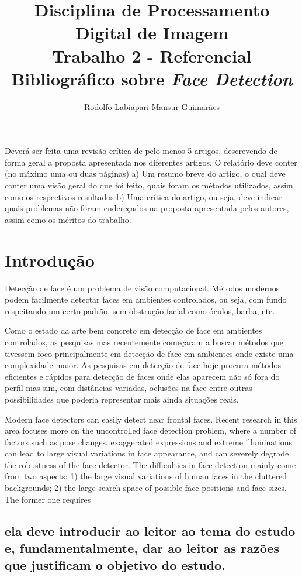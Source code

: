 \documentclass[12pt]{article}
\title{Disciplina de Processamento Digital de Imagem \\ Trabalho 2 - Referencial Bibliográfico sobre \textit{Face Detection}}
\author{Rodolfo Labiapari Mansur Guimarães}
\begin{document}
 

\maketitle

\begin{resumo} 
  Deverá ser feita uma revisão crítica de pelo menos 5 artigos, descrevendo de forma geral a proposta apresentada nos diferentes artigos. 
  O relatório deve conter (no máximo uma ou duas páginas)
  a) Um resumo breve do artigo, o qual deve conter uma visão geral do que foi feito, quais foram os métodos utilizados, assim como os respectivos resultados
  b) Uma crítica do artigo, ou seja, deve indicar quais problemas não foram endereçados na proposta apresentada pelos autores, assim como os méritos do trabalho.
\end{resumo}

\section{Introdução}
	Detecção de face é um problema de visão computacional. Métodos modernos podem facilmente detectar faces em ambientes controlados, ou seja, com fundo respeitando um certo padrão, sem obstrução facial como óculos, barba, etc. 
	
	Como o estado da arte bem concreto em detecção de face em ambientes controlados, as pesquisas mas recentemente começaram a buscar métodos que tivessem foco principalmente em detecção de face em ambientes onde existe uma complexidade maior. As pesquisas em detecção de face hoje procura métodos eficientes e rápidos para detecção de faces onde elas aparecem não só fora do perfil mas sim, com distâncias variadas, oclusões na face entre outras possibilidades que poderia representar mais ainda situações reais.
	
	
	
Modern face detectors can easily detect near frontal
faces. Recent research in this area focuses more on the
uncontrolled face detection problem, where a number of
factors such as pose changes, exaggerated expressions and
extreme illuminations can lead to large visual variations in
face appearance, and can severely degrade the robustness of
the face detector.
The difficulties in face detection mainly come from two
aspects: 1) the large visual variations of human faces in the
cluttered backgrounds; 2) the large search space of possible
face positions and face sizes. The former one requires
\subsection{ela deve introducir ao leitor ao tema do estudo e, fundamentalmente, dar ao leitor as razões que justificam o objetivo do estudo.}
\end{document}

